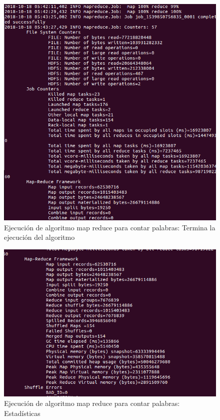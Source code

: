 \begin{figure}[!htbp]
	\hypertarget{fig:redi6}{\hspace{1pt}}
	\begin{center}
		\includegraphics[width=.9\textwidth]{capitulo4/images/ejemplo6.png}
		\caption{Ejecución de algoritmo map reduce para contar palabras: Termina la ejecución del algoritmo}
		\label{fig:redi6}
	\end{center}
\end{figure}
\newpage
\begin{figure}[!htbp]
	\hypertarget{fig:redi7}{\hspace{1pt}}
	\begin{center}
		\includegraphics[width=.9\textwidth]{capitulo4/images/ejemplo8.png}
		\caption{Ejecución de algoritmo map reduce para contar palabras: Estadísticas}
		\label{fig:redi7}
	\end{center}
\end{figure}
